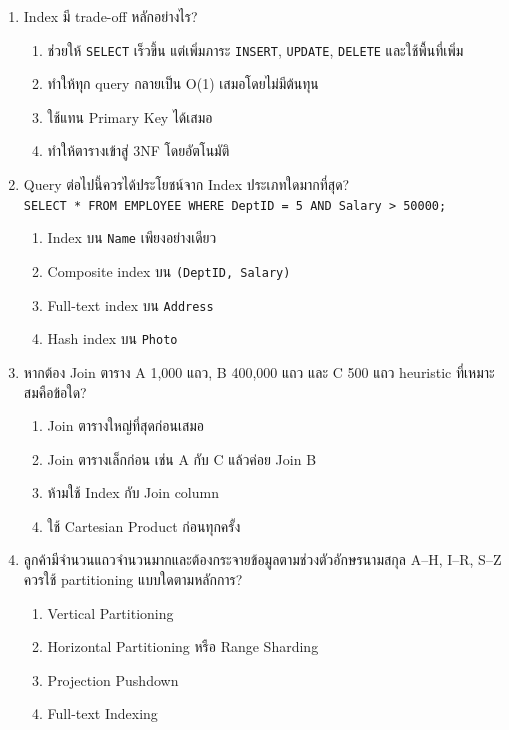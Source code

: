 \documentclass[a4paper,12pt]{article}
\begin{document}
\begin{enumerate}[label=\textbf{\arabic*.}]
    \item Index มี trade-off หลักอย่างไร?
    \begin{enumerate}[label=\alph*.]
        \item ช่วยให้ \texttt{SELECT} เร็วขึ้น แต่เพิ่มภาระ \texttt{INSERT}, \texttt{UPDATE}, \texttt{DELETE} และใช้พื้นที่เพิ่ม
        \item ทำให้ทุก query กลายเป็น O(1) เสมอโดยไม่มีต้นทุน
        \item ใช้แทน Primary Key ได้เสมอ
        \item ทำให้ตารางเข้าสู่ 3NF โดยอัตโนมัติ
    \end{enumerate}

    \item Query ต่อไปนี้ควรได้ประโยชน์จาก Index ประเภทใดมากที่สุด?\\
    \texttt{SELECT * FROM EMPLOYEE WHERE DeptID = 5 AND Salary > 50000;}
    \begin{enumerate}[label=\alph*.]
        \item Index บน \texttt{Name} เพียงอย่างเดียว
        \item Composite index บน \texttt{(DeptID, Salary)}
        \item Full-text index บน \texttt{Address}
        \item Hash index บน \texttt{Photo}
    \end{enumerate}

    \item หากต้อง Join ตาราง A 1,000 แถว, B 400,000 แถว และ C 500 แถว heuristic ที่เหมาะสมคือข้อใด?
    \begin{enumerate}[label=\alph*.]
        \item Join ตารางใหญ่ที่สุดก่อนเสมอ
        \item Join ตารางเล็กก่อน เช่น A กับ C แล้วค่อย Join B
        \item ห้ามใช้ Index กับ Join column
        \item ใช้ Cartesian Product ก่อนทุกครั้ง
    \end{enumerate}

    \item ลูกค้ามีจำนวนแถวจำนวนมากและต้องกระจายข้อมูลตามช่วงตัวอักษรนามสกุล A--H, I--R, S--Z ควรใช้ partitioning แบบใดตามหลักการ?
    \begin{enumerate}[label=\alph*.]
        \item Vertical Partitioning
        \item Horizontal Partitioning หรือ Range Sharding
        \item Projection Pushdown
        \item Full-text Indexing
    \end{enumerate}


\end{enumerate}
\end{document}
